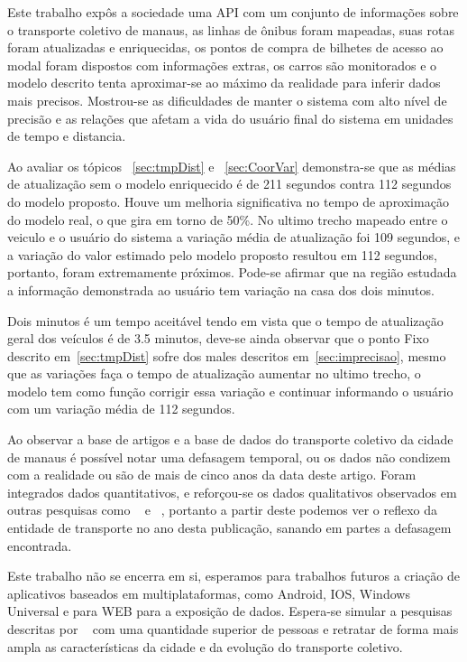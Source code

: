 \documentclass[12pt]{article}
\begin{document}
Este trabalho expôs a sociedade uma API com um conjunto de informações sobre o transporte coletivo de manaus, as linhas de ônibus foram mapeadas, suas rotas foram atualizadas e enriquecidas, os pontos de compra de bilhetes de acesso ao modal foram dispostos com informações extras, os carros são monitorados e o modelo descrito tenta aproximar-se ao máximo da realidade para inferir dados mais precisos. Mostrou-se as dificuldades de manter o sistema com alto nível de precisão e as relações que afetam a vida do usuário final do sistema em unidades de tempo e distancia. 

Ao avaliar os tópicos ~\ref{sec:tmpDist} e ~\ref{sec:CoorVar} demonstra-se que as médias de atualização sem o modelo enriquecido é de 211 segundos contra 112 segundos do modelo proposto. Houve um melhoria significativa no tempo de aproximação do modelo real, o que gira em torno de 50\%. No ultimo trecho mapeado entre o veiculo e o usuário do sistema a variação média de atualização foi 109 segundos, e a variação do valor estimado pelo modelo proposto resultou em 112 segundos, portanto, foram extremamente próximos. Pode-se afirmar que na região estudada a informação demonstrada ao usuário tem variação na casa dos dois minutos. 

Dois minutos é um tempo aceitável tendo em vista que o tempo de atualização geral dos veículos é de 3.5 minutos, deve-se ainda observar que o ponto Fixo descrito em~\ref{sec:tmpDist} sofre dos males descritos em~\ref{sec:imprecisao}, mesmo que as variações faça o tempo de atualização aumentar no ultimo trecho, o modelo tem como função corrigir essa variação e continuar informando o usuário com um variação média de 112 segundos.

Ao observar a base de artigos e a base de dados do transporte coletivo da cidade de manaus é possível notar uma defasagem temporal, ou os dados não condizem com a realidade ou são de mais de cinco anos da data deste artigo. Foram integrados dados quantitativos, e reforçou-se os dados qualitativos observados em outras pesquisas como ~\cite{art10} e ~\cite{art11}, portanto a partir deste podemos ver o reflexo da entidade de transporte no ano desta publicação, sanando em partes a defasagem encontrada.

Este trabalho não se encerra em si, esperamos para trabalhos futuros a criação de aplicativos baseados em multiplataformas, como Android, IOS, Windows Universal e para WEB para a exposição de dados. Espera-se simular a pesquisas descritas por ~\cite{art10} com uma quantidade superior de pessoas e retratar de forma mais ampla as características da cidade e da evolução do transporte coletivo.




\end{document}
